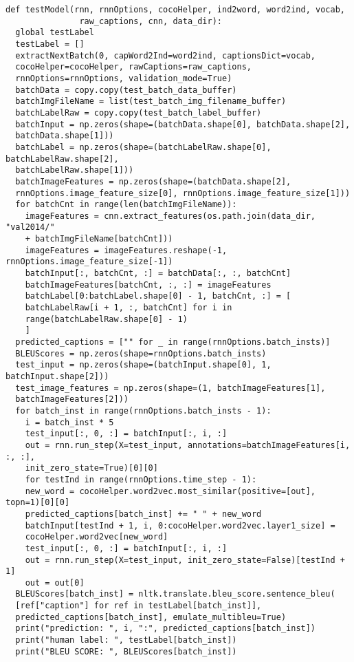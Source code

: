\begin{latin}
\begin{verbatim}
def testModel(rnn, rnnOptions, cocoHelper, ind2word, word2ind, vocab,
               raw_captions, cnn, data_dir):
  global testLabel
  testLabel = []
  extractNextBatch(0, capWord2Ind=word2ind, captionsDict=vocab, 
  cocoHelper=cocoHelper, rawCaptions=raw_captions,
  rnnOptions=rnnOptions, validation_mode=True)
  batchData = copy.copy(test_batch_data_buffer)
  batchImgFileName = list(test_batch_img_filename_buffer)
  batchLabelRaw = copy.copy(test_batch_label_buffer)
  batchInput = np.zeros(shape=(batchData.shape[0], batchData.shape[2], 
  batchData.shape[1]))
  batchLabel = np.zeros(shape=(batchLabelRaw.shape[0], batchLabelRaw.shape[2],
  batchLabelRaw.shape[1]))
  batchImageFeatures = np.zeros(shape=(batchData.shape[2], 
  rnnOptions.image_feature_size[0], rnnOptions.image_feature_size[1]))
  for batchCnt in range(len(batchImgFileName)):
    imageFeatures = cnn.extract_features(os.path.join(data_dir, "val2014/" 
    + batchImgFileName[batchCnt]))
    imageFeatures = imageFeatures.reshape(-1, rnnOptions.image_feature_size[-1])
    batchInput[:, batchCnt, :] = batchData[:, :, batchCnt]
    batchImageFeatures[batchCnt, :, :] = imageFeatures
    batchLabel[0:batchLabel.shape[0] - 1, batchCnt, :] = [
    batchLabelRaw[i + 1, :, batchCnt] for i in
    range(batchLabelRaw.shape[0] - 1)
    ]
  predicted_captions = ["" for _ in range(rnnOptions.batch_insts)]
  BLEUScores = np.zeros(shape=rnnOptions.batch_insts)
  test_input = np.zeros(shape=(batchInput.shape[0], 1, batchInput.shape[2]))
  test_image_features = np.zeros(shape=(1, batchImageFeatures[1], 
  batchImageFeatures[2]))
  for batch_inst in range(rnnOptions.batch_insts - 1):
    i = batch_inst * 5
    test_input[:, 0, :] = batchInput[:, i, :]
    out = rnn.run_step(X=test_input, annotations=batchImageFeatures[i, :, :], 
    init_zero_state=True)[0][0]
    for testInd in range(rnnOptions.time_step - 1):
    new_word = cocoHelper.word2vec.most_similar(positive=[out], topn=1)[0][0]
    predicted_captions[batch_inst] += " " + new_word
    batchInput[testInd + 1, i, 0:cocoHelper.word2vec.layer1_size] = 
    cocoHelper.word2vec[new_word]
    test_input[:, 0, :] = batchInput[:, i, :]
    out = rnn.run_step(X=test_input, init_zero_state=False)[testInd + 1]
    out = out[0]
  BLEUScores[batch_inst] = nltk.translate.bleu_score.sentence_bleu(
  [ref["caption"] for ref in testLabel[batch_inst]],
  predicted_captions[batch_inst], emulate_multibleu=True)
  print("prediction: ", i, ":", predicted_captions[batch_inst])
  print("human label: ", testLabel[batch_inst])
  print("BLEU SCORE: ", BLEUScores[batch_inst])
\end{verbatim}
\end{latin}

